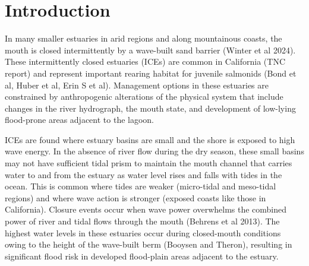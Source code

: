 \documentclass[preprint,12pt,authoryear]{elsarticle}
\begin{document}

%  

\section{Introduction}
\label{sec:intro}


In many smaller estuaries in arid regions and along mountainous coasts, the mouth is closed intermittently by a wave-built sand barrier \citep{mcsweeney2017intermittently, largier2023recognizing}(Winter et al 2024). These intermittently closed estuaries (ICEs) are common in California (TNC report) and represent important rearing habitat for juvenile salmonids (Bond et al, Huber et al, Erin S et al).  Management options in these estuaries are constrained by anthropogenic alterations of the physical system that include changes in the river hydrograph, the mouth state, and development of low-lying flood-prone areas adjacent to the lagoon. 

ICEs are found where estuary basins are small and the shore is exposed to high wave energy. In the absence of river flow during the dry season, these small basins may not have sufficient tidal prism to maintain the mouth channel that carries water to and from the estuary as water level rises and falls with tides in the ocean. This is common where tides are weaker (micro-tidal and meso-tidal regions) and where wave action is stronger (exposed coasts like those in California). Closure events occur when wave power overwhelms the combined power of river and tidal flows through the mouth (Behrens et al 2013). The highest water levels in these estuaries occur during closed-mouth conditions owing to the height of the wave-built berm (Booysen and Theron), resulting in significant flood risk in developed flood-plain areas adjacent to the estuary.
\end{document}
